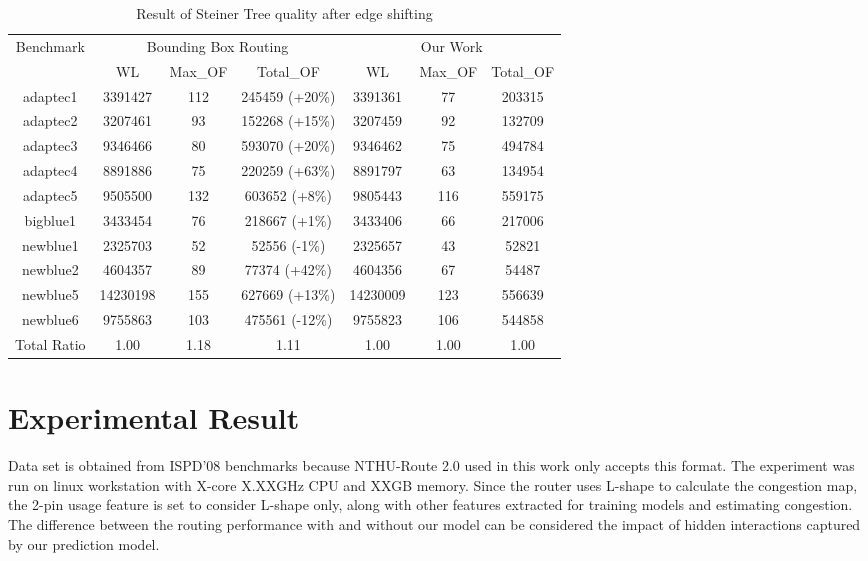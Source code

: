 \begin{table*}[htbp]
    \centering
    \caption{Result of Steiner Tree quality after edge shifting}
    \label{tab:treequality}
    \begin{tabular}{c|c|c|c|c|c|c}
        \toprule
        \multirow{2}{*}{Benchmark} & \multicolumn{3}{c|}{Bounding Box Routing}     & \multicolumn{3}{c}{Our Work}  \\ \cline{2-7} 
                           & WL       & Max\_OF & Total\_OF      & WL       & Max\_OF & Total\_OF \\ \hline
        adaptec1                   & 3391427  & 112     & 245459 (+20\%) & 3391361  & 77      & 203315    \\ \hline
        adaptec2                   & 3207461  & 93      & 152268 (+15\%) & 3207459  & 92      & 132709    \\ \hline
        adaptec3                   & 9346466  & 80      & 593070 (+20\%) & 9346462  & 75      & 494784    \\ \hline
        adaptec4                   & 8891886  & 75      & 220259 (+63\%) & 8891797  & 63      & 134954    \\ \hline
        adaptec5                   & 9505500  & 132     & 603652 (+8\%)  & 9805443  & 116     & 559175    \\ \hline
        bigblue1                   & 3433454  & 76      & 218667 (+1\%)  & 3433406  & 66      & 217006    \\ \hline
        newblue1                   & 2325703  & 52      & 52556 (-1\%)   & 2325657  & 43      & 52821     \\ \hline
        newblue2                   & 4604357  & 89      & 77374 (+42\%)  & 4604356  & 67      & 54487     \\ \hline
        newblue5                   & 14230198 & 155     & 627669 (+13\%) & 14230009 & 123     & 556639    \\ \hline
        newblue6                   & 9755863  & 103     & 475561 (-12\%) & 9755823  & 106     & 544858    \\ \hline
        Total Ratio  & 1.00     & 1.18    & 1.11           & 1.00        & 1.00       & 1.00         \\ \bottomrule
    \end{tabular}
\end{table*}

\section{Experimental Result}
\label{sec:result}
Data set is obtained from ISPD'08 benchmarks because NTHU-Route 2.0 used in this work only accepts this format. The experiment was run on linux workstation with X-core X.XXGHz CPU and XXGB memory. Since the router uses L-shape to calculate the congestion map, the 2-pin usage feature is set to consider L-shape only, along with other features  extracted for training models and estimating congestion. The difference between the routing performance with and without our model can be considered the impact of hidden interactions captured by our prediction model.

